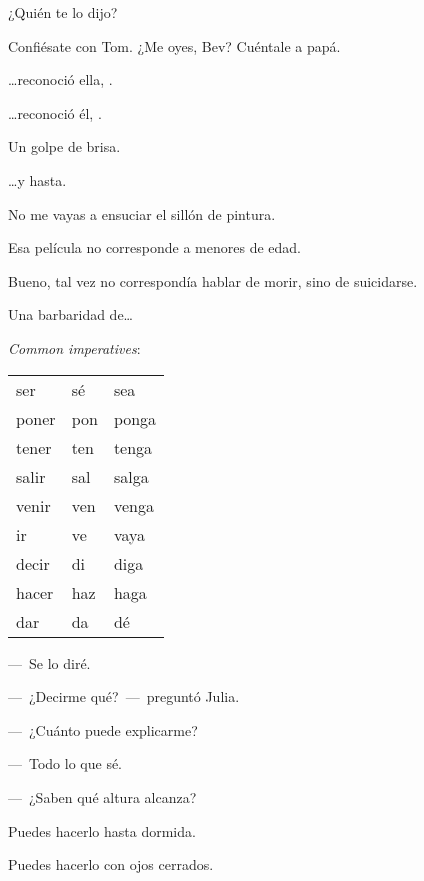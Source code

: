 \sk
¿Quién te lo dijo? 

\sk
Confiésate con Tom. ¿Me oyes, Bev? Cuéntale a papá.

\sk
\ldots{}reconoció ella, . 

\sk
\ldots{}reconoció él, . 

\sk
Un golpe de brisa. 

\sk
\ldots{}y hasta. 

\sk
No me vayas a ensuciar el sillón de pintura. 

\sk
Esa película no corresponde a menores de edad. 

\sk
Bueno, tal vez no correspondía hablar de morir, sino de suicidarse. 

\sk
Una barbaridad de\ldots{} 

\bsk
\textit{Common imperatives}:

\sk
\begin{tabular}{lll}
    ser   & sé  & sea\\
    poner & pon & ponga\\
    tener & ten & tenga\\
    salir & sal & salga\\
    venir & ven & venga\\
    ir    & ve  & vaya\\
    decir & di  & diga\\
    hacer & haz & haga\\
    dar   & da  & dé\\
\end{tabular}

\bsk
---~Se lo diré. 

---~¿Decirme qué?~---~preguntó Julia. 

\sk
---~¿Cuánto puede explicarme? 

---~Todo lo que sé. 

\sk
---~¿Saben qué altura alcanza? 

\sk
Puedes hacerlo hasta dormida. 

\sk
Puedes hacerlo con ojos cerrados. 

